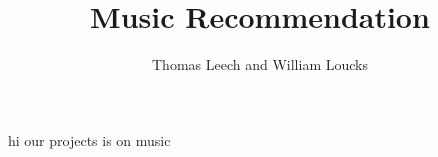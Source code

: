 \documentclass[11pt]{article}
\theoremstyle{plain}
\theoremstyle{definition}
\begin{document}
   	
   	\title{ Music Recommendation }
   	\author{ Thomas Leech and William Loucks }
   	\maketitle
   	hi our projects is on music
   	
   	
   	
   	
   		
   
\end{document}

